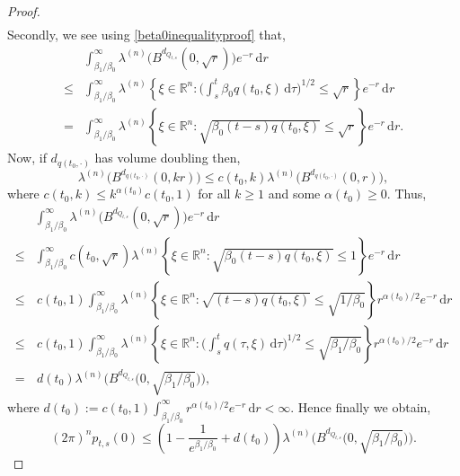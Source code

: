 \documentclass[a4paper, 12pt]{report}
\theoremstyle{remark}
\theoremstyle{definition}
\begin{document}
\begin{proof}
$$\begin{aligned}
\end{aligned}
$$
Secondly, we see using \eqref{beta0inequalityproof} that,
$$
\begin{aligned}
& \int_{\beta_1/\beta_0}^\infty\lambda^{(n)}\big(B^{d_{Q_{t, s}}}(0, \sqrt{r})\big)e^{-r}\,\mathrm{d}r\\
\le & \int_{\beta_1/\beta_0}^\infty\lambda^{(n)}\left\{\xi \in \mathbb{R}^n : \bigg(\int_s^t\beta_0q(t_0, \xi)\,\mathrm{d}\tau\bigg)^{1/2} \le \sqrt{r}\right\}e^{-r}\,\mathrm{d}r\\
= & \int_{\beta_1/\beta_0}^\infty\lambda^{(n)}\left\{\xi \in \mathbb{R}^n : \sqrt{\beta_0(t - s)q(t_0, \xi)} \le \sqrt{r}\right\}e^{-r}\,\mathrm{d}r.
\end{aligned}
$$
Now, if $d_{q(t_0, \cdot)}$ has volume doubling then,
$$
\lambda^{(n)}\big(B^{d_{q(t_0, \cdot)}}(0, kr)\big) \le c(t_0, k)\lambda^{(n)}\big(B^{d_{q(t_0, \cdot)}}(0, r)\big),
$$
where $c(t_0, k) \le k^{\alpha(t_0)}c(t_0, 1)$ for all $k \ge 1$ and some $\alpha(t_0) \ge 0$.  Thus,
$$
\begin{aligned}
& \int_{\beta_1/\beta_0}^\infty\lambda^{(n)}\big(B^{d_{Q_{t, s}}}(0, \sqrt{r})\big)e^{-r}\,\mathrm{d}r\\
\le & \int_{\beta_1/\beta_0}^\infty c(t_0, \sqrt{r})\lambda^{(n)}\left\{\xi \in \mathbb{R}^n : \sqrt{\beta_0(t - s)q(t_0, \xi)} \le 1\right\}e^{-r}\,\mathrm{d}r\\
\le & \, c(t_0, 1)\int_{\beta_1/\beta_0}^\infty\lambda^{(n)}\left\{\xi \in \mathbb{R}^n : \sqrt{(t - s)q(t_0, \xi)} \le \sqrt{1/\beta_0}\right\}r^{\alpha(t_0)/2}e^{-r}\,\mathrm{d}r\\
\le & \, c(t_0, 1)\int_{\beta_1/\beta_0}^\infty\lambda^{(n)}\left\{\xi \in \mathbb{R}^n : \bigg(\int_s^tq(\tau, \xi)\,\mathrm{d}\tau\bigg)^{1/2} \le \sqrt{\beta_1/\beta_0}\right\}r^{\alpha(t_0)/2}e^{-r}\,\mathrm{d}r\\
= & \, d(t_0)\lambda^{(n)}\Big(B^{d_{Q_{t, s}}}\big(0, \sqrt{\beta_1/\beta_0}\big)\Big),
\end{aligned}
$$
where $d(t_0) := c(t_0, 1)\int_{\beta_1/\beta_0}^\infty r^{\alpha(t_0)/2}e^{-r}\,\mathrm{d}r < \infty$.  Hence finally we obtain,
$$
(2\pi)^np_{t, s}(0) \le \left(1 - \frac{1}{e^{\beta_1/\beta_0}} + d(t_0)\right)\lambda^{(n)}\Big(B^{d_{Q_{t, s}}}\big(0, \sqrt{\beta_1/\beta_0}\big)\Big).
$$
\end{proof}
\end{document}
